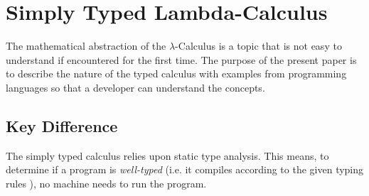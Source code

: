 \section{Simply Typed Lambda-Calculus}

The mathematical abstraction of the $\lambda$-Calculus
is a topic that is not easy to understand if encountered
for the first time. The purpose of the present paper is to
describe the nature of the typed calculus with examples from
programming languages so that a developer can understand the
concepts.





\subsection{Key Difference}

The simply typed calculus relies upon static type analysis.
This means, to determine if a program is \textit{well-typed}
(i.e. it compiles according to the given typing rules \cite{cardelliTypeSystems}), no
machine needs to run the program.




